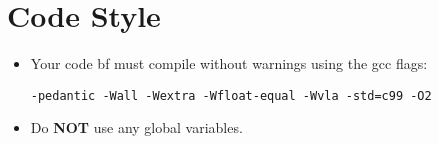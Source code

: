 \section*{Code Style}
\begin{itemize}
\item Your code {bf must} compile without warnings using the gcc flags:
\begin{verbatim}
-pedantic -Wall -Wextra -Wfloat-equal -Wvla -std=c99 -O2
\end{verbatim}
\item Do {\bf NOT} use any global variables.
\end{itemize}
